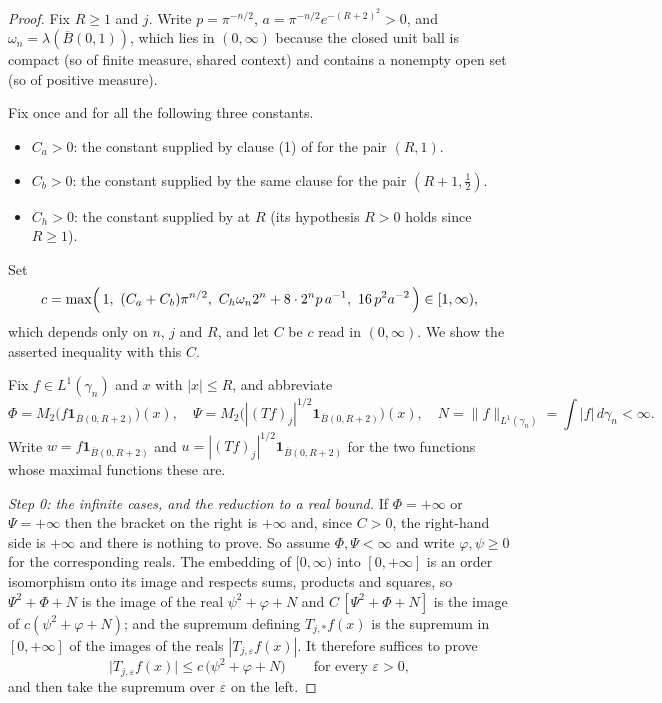 \begin{proof}
Fix $R \geq 1$ and $j$.  Write $p = \pi^{-n/2}$,
$a = \pi^{-n/2}e^{-(R+2)^2} > 0$, and $\omega_n = \lambda(\overline B(0,1))$,
which lies in $(0,\infty)$ because the closed unit ball is compact (so of
finite measure, shared context) and contains a nonempty open set (so of
positive measure).

Fix once and for all the following three constants.
\begin{itemize}
\item $C_a > 0$: the constant supplied by clause (1) of
 for the pair $(R,1)$.
\item $C_b > 0$: the constant supplied by the same clause for the pair
$(R+1,\tfrac12)$.
\item $C_h > 0$: the constant supplied by 
at $R$ (its hypothesis $R > 0$ holds since $R \geq 1$).
\end{itemize}
Set
\[
  c = \max\Bigl(\,1,\ (C_a+C_b)\pi^{n/2},\
      C_h\omega_n2^n + 8\cdot2^n p\,a^{-1},\
      16\,p^2a^{-2}\,\Bigr) \in [1,\infty) ,
\]
which depends only on $n$, $j$ and $R$, and let $C$ be $c$ read in
$(0,\infty)$.  We show the asserted inequality with this $C$.

Fix $f \in L^1(\gamma_n)$ and $x$ with $|x| \leq R$, and abbreviate
\[
  \Phi = M_2\bigl(f\mathbf 1_{\overline B(0,R+2)}\bigr)(x),
  \quad
  \Psi = M_2\bigl(|(Tf)_j|^{1/2}\mathbf 1_{\overline B(0,R+2)}\bigr)(x),
  \quad
  N = \|f\|_{L^1(\gamma_n)} = \int|f|\,d\gamma_n < \infty .
\]
Write $w = f\mathbf 1_{\overline B(0,R+2)}$ and
$u = |(Tf)_j|^{1/2}\mathbf 1_{\overline B(0,R+2)}$ for the two functions whose
maximal functions these are.

\emph{Step 0: the infinite cases, and the reduction to a real bound.}
If $\Phi = +\infty$ or $\Psi = +\infty$ then the bracket on the right is
$+\infty$ and, since $C > 0$, the right-hand side is $+\infty$ and there is
nothing to prove.  So assume $\Phi,\Psi < \infty$ and write $\varphi,\psi \geq 0$ for the
corresponding reals.  The embedding of $[0,\infty)$ into $[0,+\infty]$ is an
order isomorphism onto its image and respects sums, products and squares, so
$\Psi^2 + \Phi + N$ is the image of the real $\psi^2+\varphi+N$ and
$C\,[\Psi^2+\Phi+N]$ is the image of $c(\psi^2+\varphi+N)$; and the supremum
defining $T_{j,*}f(x)$ is the supremum in $[0,+\infty]$ of the images of the
reals $|T_{j,\varepsilon}f(x)|$.  It therefore suffices to prove
\begin{equation*}
  \bigl|T_{j,\varepsilon}f(x)\bigr| \leq c\,\bigl(\psi^2 + \varphi + N\bigr)
  \qquad\text{for every } \varepsilon > 0 , \tag{$\star$}
\end{equation*}
and then take the supremum over $\varepsilon$ on the left.


\end{proof}

